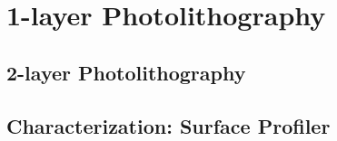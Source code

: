 

\chapter{1-layer Photolithography}
\label{1-layer-photolithography}

\section{2-layer Photolithography}
\label{2-layer-photolithography}

\section{Characterization: Surface Profiler}
\label{characterization-surface-profiler}
